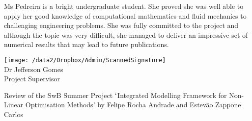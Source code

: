 \documentclass[14pt,twoside]{report}
\begin{document}
Ms Pedreira is a bright undergraduate student. She proved she was well able to apply her good knowledge of computational mathematics and fluid mechanics to challenging engineering problems. She was fully committed to the project and although the topic was very difficult, she managed to deliver an impressive set of numerical results that may lead to future publications. 
\vspace{2.cm}
\begin{center}
\texttt{[image: /data2/Dropbox/Admin/ScannedSignature]}\\
{Dr Jefferson Gomes}\\
{Project Supervisor}\\
\end{center}

\clearpage




\medskip

\begin{center}
{\large Review of the SwB Summer Project $\lq$Integrated Modelling Framework for Non-Linear Optimisation Methods' by Felipe Rocha Andrade and Estev\~ao Zappone Carlos}
\end{center}
\end{document}
